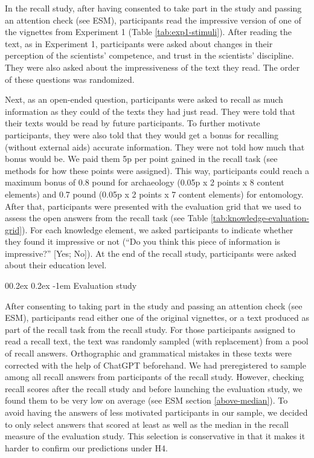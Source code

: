 \documentclass[
  english,
  doc,floatsintext]{apa6}
\makeatletter
\let\oldparagraph\paragraph
\renewcommand{\paragraph}{
    \@ifstar
      \xxxParagraphStar
      \xxxParagraphNoStar
  }
\newcommand{\xxxParagraphStar}[1]{\oldparagraph*{#1}\mbox{}}
\newcommand{\xxxParagraphNoStar}[1]{\oldparagraph{#1}\mbox{}}
\renewcommand{\paragraph}{\@startsection{paragraph}{4}{\parindent}%
  {0\baselineskip \@plus 0.2ex \@minus 0.2ex}%
  {-1em}%
  {\normalfont\normalsize\bfseries\itshape\typesectitle}}
\makeatother
\begin{document}
In the recall study, after having consented to take part in the study and passing an attention check (see ESM), participants read the impressive version of one of the vignettes from Experiment 1 (Table \ref{tab:exp1-stimuli}). After reading the text, as in Experiment 1, participants were asked about changes in their perception of the scientists' competence, and trust in the scientists' discipline. They were also asked about the impressiveness of the text they read. The order of these questions was randomized.

Next, as an open-ended question, participants were asked to recall as much information as they could of the texts they had just read. They were told that their texts would be read by future participants. To further motivate participants, they were also told that they would get a bonus for recalling (without external aids) accurate information. They were not told how much that bonus would be. We paid them 5p per point gained in the recall task (see methods for how these points were assigned). This way, participants could reach a maximum bonus of 0.8 pound for archaeology (0.05p x 2 points x 8 content elements) and 0.7 pound (0.05p x 2 points x 7 content elements) for entomology. After that, participants were presented with the evaluation grid that we used to assess the open answers from the recall task (see Table \ref{tab:knowledge-evaluation-grid}). For each knowledge element, we asked participants to indicate whether they found it impressive or not (``Do you think this piece of information is impressive?'' {[}Yes; No{]}). At the end of the recall study, participants were asked about their education level.

\paragraph{Evaluation study}\label{evaluation-study}

After consenting to taking part in the study and passing an attention check (see ESM), participants read either one of the original vignettes, or a text produced as part of the recall task from the recall study. For those participants assigned to read a recall text, the text was randomly sampled (with replacement) from a pool of recall answers. Orthographic and grammatical mistakes in these texts were corrected with the help of ChatGPT beforehand. We had preregistered to sample among all recall answers from participants of the recall study. However, checking recall scores after the recall study and before launching the evaluation study, we found them to be very low on average (see ESM section \ref{above-median}). To avoid having the answers of less motivated participants in our sample, we decided to only select answers that scored at least as well as the median in the recall measure of the evaluation study. This selection is conservative in that it makes it harder to confirm our predictions under H4.
\end{document}
